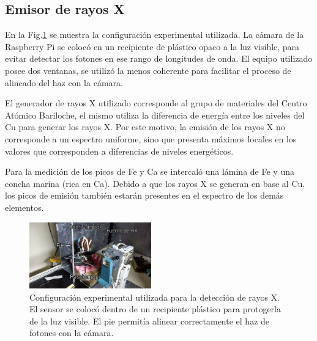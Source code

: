 \documentclass[twoside,twocolumn]{article}
\begin{document}
    \subsection{Emisor de rayos X}\label{sec:conf_exp:x-rays}
      En la Fig.\ref{fig:photo_xray} se muestra la configuración experimental utilizada.
      La cámara de la Raspberry Pi se colocó en un recipiente de plástico opaco a la luz visible,
      para evitar detectar los fotones en ese rango de longitudes de onda.
      El equipo utilizado posee dos ventanas, se utilizó la menos coherente para facilitar el proceso
      de alineado del haz con la cámara. 
      
      El generador de rayos X utilizado corresponde al grupo de materiales del Centro Atómico Bariloche,
      el mismo utiliza la diferencia de energía entre los niveles del Cu para generar los rayos X.
      Por este motivo, la emisión de los rayos X no corresponde a un espectro uniforme, sino que presenta
      máximos locales en los valores que corresponden a diferencias de niveles energéticos.
      
      Para la medición de los picos de Fe y Ca se intercaló una lámina de Fe y una concha marina (rica en Ca).
      Debido a que los rayos X se generan en base al Cu, los picos de emisión también estarán presentes en
      el espectro de los demás elementos.

      \begin{figure}[h]
        \includegraphics[width=0.47\textwidth]{figures/IMG_20180412_173110355_HDR}
        \caption{Configuración experimental utilizada para la detección de rayos X.
        El sensor se colocó dentro de un recipiente plástico para protogerla de la luz visible.
        El pie permitía alinear correctamente el haz de fotones con la cámara.
        }
        \label{fig:photo_xray}
      \end{figure}
\end{document}
